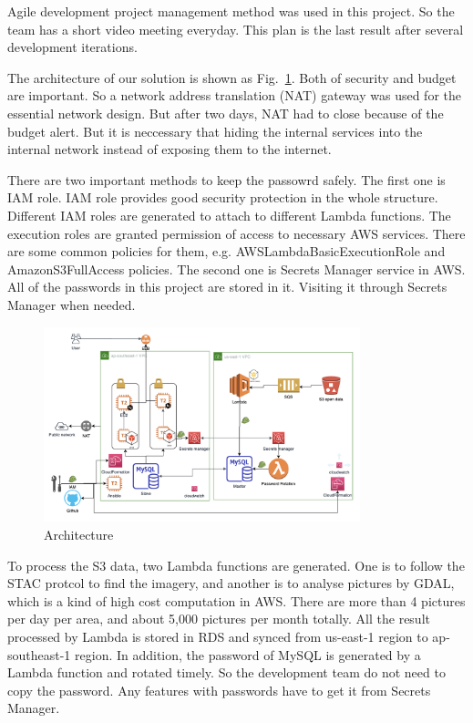 \documentclass[conference]{IEEEtran}
\begin{document}
Agile development project management method was used in this project. So the team has a short video meeting everyday. This plan is the last 
result after several development iterations.

The architecture of our solution is shown as Fig.~\ref{fig2}. Both of security and budget are important. So a network address translation (NAT) gateway 
was used for the essential network design. But after two days, NAT had to close because of the budget alert. But it is neccessary that hiding the 
internal services into the internal network instead of exposing them to the internet.

There are two important methods to keep the passowrd safely. The first one is IAM role. IAM role provides good security protection in the whole structure.
Different IAM roles are generated to attach to different Lambda functions. The execution roles are granted permission of access to necessary AWS services. 
There are some common policies for them, e.g. AWSLambdaBasicExecutionRole and AmazonS3FullAccess policies. The second one is Secrets Manager service in AWS.
All of the passwords in this project are stored in it. Visiting it through Secrets Manager when needed.


\begin{figure}[htbp]
    \centerline{\includegraphics[width=260pt]{images/arch.png}}
    \caption{Architecture}
    \label{fig2}
\end{figure}
    
To process the S3 data, two Lambda functions are generated. One is to follow the STAC protcol to find the imagery, and another is to analyse pictures by GDAL, 
which is a kind of high cost computation in AWS. There are more than 4 pictures per day per area, and about 5,000 pictures per month totally. All the result processed by 
Lambda is stored in RDS and synced from us-east-1 region to ap-southeast-1 region. In addition, the password of MySQL is generated by a Lambda function and rotated 
timely. So the development team do not need to copy the password. Any features with passwords have to get it from Secrets Manager. 
\end{document}

